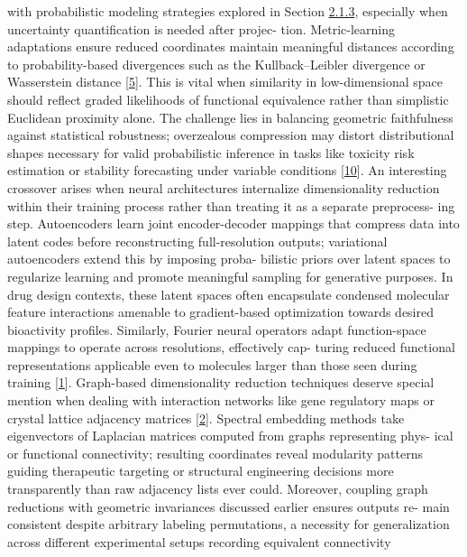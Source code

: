 \documentclass[
]{article}
\begin{document}
with probabilistic modeling strategies explored in Section
\protect\hyperlink{probabilistic-and-statistical-spaces}{2.1.3},
especially when uncertainty quantification is needed after projec- tion.
Metric-learning adaptations ensure reduced coordinates maintain
meaningful distances according to probability-based divergences such as
the Kullback--Leibler divergence or Wasserstein distance
{[}\protect\hyperlink{_bookmark45}{5}{]}. This is vital when similarity
in low-dimensional space should reflect graded likelihoods of functional
equivalence rather than simplistic Euclidean proximity alone. The
challenge lies in balancing geometric faithfulness against statistical
robustness; overzealous compression may distort distributional shapes
necessary for valid probabilistic inference in tasks like toxicity risk
estimation or stability forecasting under variable conditions
{[}\protect\hyperlink{_bookmark50}{10}{]}. An interesting crossover
arises when neural architectures internalize dimensionality reduction
within their training process rather than treating it as a separate
preprocess- ing step. Autoencoders learn joint encoder-decoder mappings
that compress data into latent codes before reconstructing
full-resolution outputs; variational autoencoders extend this by
imposing proba- bilistic priors over latent spaces to regularize
learning and promote meaningful sampling for generative purposes. In
drug design contexts, these latent spaces often encapsulate condensed
molecular feature interactions amenable to gradient-based optimization
towards desired bioactivity profiles. Similarly, Fourier neural
operators adapt function-space mappings to operate across resolutions,
effectively cap- turing reduced functional representations applicable
even to molecules larger than those seen during training
{[}\protect\hyperlink{_bookmark41}{1}{]}. Graph-based dimensionality
reduction techniques deserve special mention when dealing with
interaction networks like gene regulatory maps or crystal lattice
adjacency matrices {[}\protect\hyperlink{_bookmark42}{2}{]}. Spectral
embedding methods take eigenvectors of Laplacian matrices computed from
graphs representing phys- ical or functional connectivity; resulting
coordinates reveal modularity patterns guiding therapeutic targeting or
structural engineering decisions more transparently than raw adjacency
lists ever could. Moreover, coupling graph reductions with geometric
invariances discussed earlier ensures outputs re- main consistent
despite arbitrary labeling permutations, a necessity for generalization
across different experimental setups recording equivalent connectivity
\end{document}
